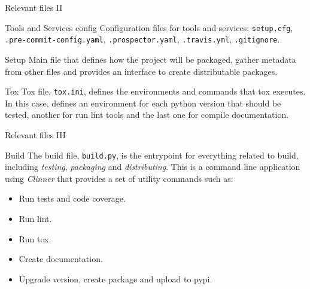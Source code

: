 \begin{frame}{Relevant files II}
    \begin{block}{Tools and Services config}
        Configuration files for tools and services: \texttt{setup.cfg}, \texttt{.pre-commit-config.yaml}, \texttt{.prospector.yaml}, \texttt{.travis.yml}, \texttt{.gitignore}.
    \end{block}
    \pause
    \begin{block}{Setup}
        Main file that defines how the project will be packaged, gather metadata from other files and provides an interface to create distributable packages.
    \end{block}
    \pause
    \begin{block}{Tox}
        Tox file, \texttt{tox.ini}, defines the environments and commands that tox executes. In this case, defines an environment for each python version that should be tested, another for run lint tools and the last one for compile documentation.
    \end{block}
\end{frame}
\begin{frame}{Relevant files III}
    \begin{block}{Build}
        The build file, \texttt{build.py}, is the entrypoint for everything related to build, including \emph{testing}, \emph{packaging} and \emph{distributing}. This is a command line application using \emph{Clinner} that provides a set of utility commands such as:
        \begin{itemize}
            \item Run tests and code coverage.
            \item Run lint.
            \item Run tox.
            \item Create documentation.
            \item Upgrade version, create package and upload to pypi.
        \end{itemize}
    \end{block}
\end{frame}

